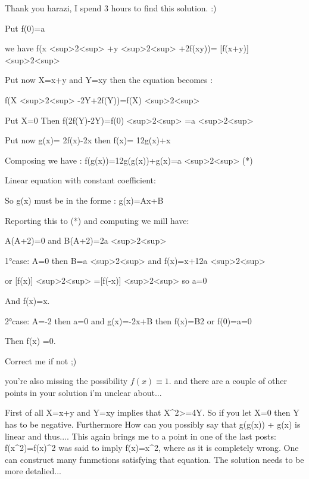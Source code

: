 \begin{solution}
	Thank you harazi, I spend 3 hours to find this solution.
 :) 

Put f(0)=a

we have f(x <sup>2<\/sup> +y <sup>2<\/sup> +2f(xy))= [f(x+y)] <sup>2<\/sup> 

Put now X=x+y and Y=xy then the equation becomes :

         f(X <sup>2<\/sup> -2Y+2f(Y))=f(X) <sup>2<\/sup> 

Put X=0 Then   f(2f(Y)-2Y)=f(0) <sup>2<\/sup> =a <sup>2<\/sup> 

Put now g(x)= 2f(x)-2x   then f(x)= 1\/2g(x)+x

Composing we have :  f(g(x))=1\/2g(g(x))+g(x)=a <sup>2<\/sup> (*)

Linear equation with constant coefficient:

So g(x) must be in the forme  : g(x)=Ax+B

Reporting this to (*) and computing we mill have:

   A(A+2)=0 and B(A+2)=2a <sup>2<\/sup> 

1°case:   A=0  then B=a <sup>2<\/sup>  and f(x)=x+1\/2a <sup>2<\/sup> 
   
or [f(x)] <sup>2<\/sup> =[f(-x)] <sup>2<\/sup> so a=0 

And f(x)=x.

2°case: A=-2  then a=0  and g(x)=-2x+B then f(x)=B\/2 or f(0)=a=0

Then f(x) =0.


Correct me if not ;)
\end{solution}



\begin{solution}
	you're also missing the possibility $ f(x) \equiv 1$.
and there are a couple of other points in your solution i'm unclear about...
\end{solution}



\begin{solution}
	First of all X=x+y and Y=xy implies that X^2>=4Y.
So if you let X=0 then Y has to be negative. Furthermore 
How can you possibly say that g(g(x)) + g(x) is linear and thus....
This again brings me to a point in one of the last posts:
f(x^2)=f(x)^2 was said to imply f(x)=x^2, where as it is completely wrong. One can construct many funmctions satisfying that equation.
The solution needs to be more detalied...
\end{solution}



